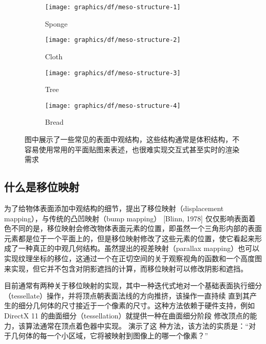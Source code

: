 \begin{figure}
\begin{fullwidth}
	\begin{subfigure}[t]{0.17\thewidth}
		\texttt{[image: graphics/df/meso-structure-1]}
		\caption{Sponge}
	\end{subfigure}
	\begin{subfigure}[t]{.285\thewidth}
		\texttt{[image: graphics/df/meso-structure-2]}
		\caption{Cloth}
	\end{subfigure}
	\begin{subfigure}[t]{.23\thewidth}
		\texttt{[image: graphics/df/meso-structure-3]}
		\caption{Tree}
	\end{subfigure}
	\begin{subfigure}[t]{.26\thewidth}
		\texttt{[image: graphics/df/meso-structure-4]}
		\caption{Bread}
	\end{subfigure}
	\caption{图中展示了一些常见的表面中观结构，这些结构通常是体积结构，不容易使用常用的平面贴图来表述，也很难实现交互式甚至实时的渲染需求}
	\label{f:df-meso-structure}
\end{fullwidth}
\end{figure}

\subsection{什么是移位映射}
为了给物体表面添加中观结构的细节，\cite{a:Shade-Trees}提出了移位映射（displacement mapping），与传统的凸凹映射（bump mapping）\cite{a:SimulationofWrinkledSurfaces} [Blinn, 1978] 仅仅影响表面着色不同的是，移位映射会修改物体表面元素的位置，即虽然一个三角形内部的表面元素都是位于一个平面上的，但是移位映射修改了这些元素的位置，使它看起来形成了一种真正的中观几何结构。虽然\cite{a:DetailedShapeRepresentationwithParallaxMapping}提出的视差映射（parallax mapping）也可以实现纹理坐标的移位，这通过一个在正切空间的关于观察视角的函数和一个高度图来实现，但它并不包含对阴影遮挡的计算，而移位映射可以修改阴影和遮挡。 

目前通常有两种关于移位映射的实现，其中一种迭代式地对一个基础表面执行细分（tessellate）操作，并将顶点朝表面法线的方向推挤，该操作一直持续 直到其产生的细分几何体的尺寸接近于一个像素的尺寸。这种方法依赖于硬件支持，例如DirectX 11 的曲面细分（tessellation）就提供一种在曲面细分阶段 修改顶点的能力，该算法通常在顶点着色器中实现。\cite{a:AdaptiveTessellationofSubdivisionSurfaceswithDisplacementMapping} 演示了这 种方法，该方法的实质是：“对于几何体的每一个小区域，它将被映射到图像上的哪一个像素？” 

